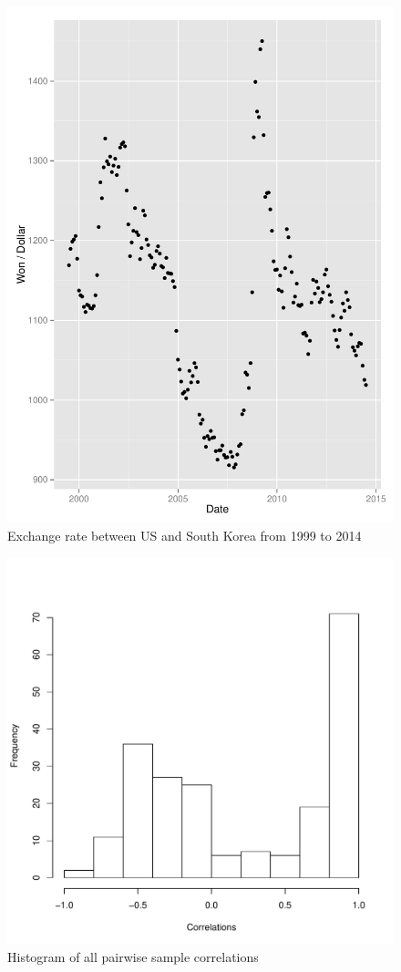 \documentclass[12pt]{article}
\begin{document}
\begin{figure}
  \centering
    \includegraphics{exchange_rate.pdf}
  \caption{Exchange rate between US and South Korea from 1999 to 2014}
  \label{fig:exchange_rate}
\end{figure}

\begin{figure}
  \centering
    \includegraphics{correlation.pdf}
  \caption{Histogram of all pairwise sample correlations}
  \label{fig:correlation}
\end{figure}
\end{document}
